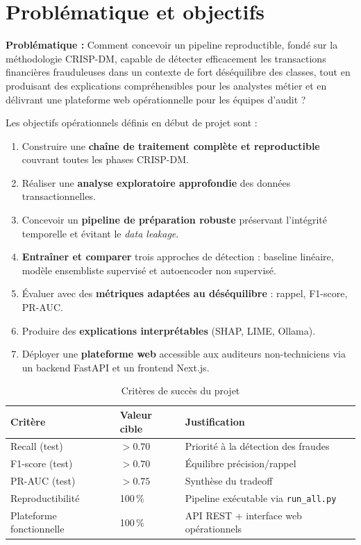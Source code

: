 \documentclass[12pt,a4paper,twoside]{report}
\begin{document}
\section{Problématique et objectifs}

\begin{definitionbox}
\textbf{Problématique :} Comment concevoir un pipeline reproductible, fondé sur la méthodologie CRISP-DM, capable de détecter efficacement les transactions financières frauduleuses dans un contexte de fort déséquilibre des classes, tout en produisant des explications compréhensibles pour les analystes métier et en délivrant une plateforme web opérationnelle pour les équipes d'audit ?
\end{definitionbox}

Les objectifs opérationnels définis en début de projet sont :

\begin{enumerate}
  \item Construire une \textbf{chaîne de traitement complète et reproductible} couvrant toutes les phases CRISP-DM.
  \item Réaliser une \textbf{analyse exploratoire approfondie} des données transactionnelles.
  \item Concevoir un \textbf{pipeline de préparation robuste} préservant l'intégrité temporelle et évitant le \textit{data leakage}.
  \item \textbf{Entraîner et comparer} trois approches de détection : baseline linéaire, modèle ensembliste supervisé et autoencoder non supervisé.
  \item Évaluer avec des \textbf{métriques adaptées au déséquilibre} : rappel, F1-score, PR-AUC.
  \item Produire des \textbf{explications interprétables} (SHAP, LIME, Ollama).
  \item Déployer une \textbf{plateforme web} accessible aux auditeurs non-techniciens via un backend FastAPI et un frontend Next.js.
\end{enumerate}

\begin{table}[H]
\centering
\caption{Critères de succès du projet}
\label{tab:criteres_succes}
\begin{tabular}{lll}
\toprule
\textbf{Critère}       & \textbf{Valeur cible} & \textbf{Justification} \\
\midrule
Recall (test)          & $> 0.70$ & Priorité à la détection des fraudes \\
F1-score (test)        & $> 0.70$ & Équilibre précision/rappel \\
PR-AUC (test)          & $> 0.75$ & Synthèse du tradeoff \\
Reproductibilité       & 100\,\%  & Pipeline exécutable via \texttt{run\_all.py} \\
Plateforme fonctionnelle & 100\,\% & API REST + interface web opérationnels \\
\bottomrule
\end{tabular}
\end{table}
\end{document}
